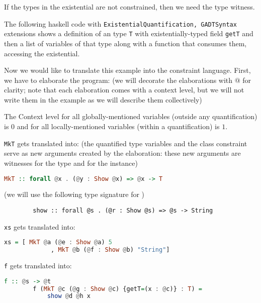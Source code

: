 If the types in the existential are not constrained, then we need the type witness.

\begin{ex}[Existentials]
    The following haskell code with \lstinline{ExistentialQuantification, GADTSyntax} extensions shows a definition of an type \lstinline{T} with existentially-typed field \lstinline{getT} and then a list of variables of that type along with a function that consumes them, accessing the existential.

    

    Now we would like to translate this example into the constraint language. First, we have to elaborate the program: (we will decorate the elaborations with $@$ for clarity; note that each elaboration comes with a context level, but we will not write them in the example as we will describe them collectively)

    The Context level for all globally-mentioned variables (outside any quantification) is $0$ and for all locally-mentioned variables (within a quantification) is $1$.

    \lstinline{MkT} gets translated into: (the quantified type variables and the class constraint serve as new arguments created by the elaboration: these new arguments are witnesses for the type and for the  instance)
    \begin{lstlisting}[language=Haskell]
        MkT :: forall @x . (@y : Show @x) => @x -> T
    \end{lstlisting}

    (we will use the following type signature for )
    \begin{lstlisting}
        show :: forall @s . (@r : Show @s) => @s -> String
    \end{lstlisting}

    \lstinline{xs} gets translated into:

    \begin{lstlisting}[language=Haskell]
        xs = [ MkT @a (@e : Show @a) 5
             , MkT @b (@f : Show @b) "String"]
    \end{lstlisting}

    \lstinline{f} gets translated into:

    \begin{lstlisting}[language=Haskell]
        f :: @s -> @t
        f (MkT @c (@g : Show @c) {getT=(x : @c)} : T) =
            show @d @h x
    \end{lstlisting}


\end{ex}
